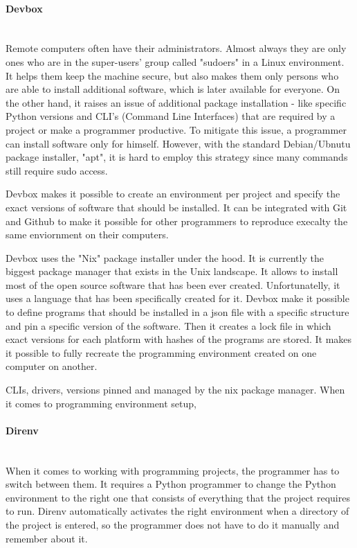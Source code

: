 \paragraph{Devbox}\mbox{}\\
\indent Remote computers often have their administrators. Almost always they are only ones who are in the super-users' group called "sudoers" in a Linux environment. It helps them keep the machine secure, but also makes them only persons who are able to install additional software, which is later available for everyone. On the other hand, it raises an issue of additional package installation - like specific Python versions and CLI's (Command Line Interfaces) that are required by a project or make a programmer productive.  
To mitigate this issue, a programmer can install software only for himself. However, with the standard Debian/Ubnutu package installer, "apt", it is hard to employ this strategy since many commands still require sudo access. 

Devbox makes it possible to create an environment per project and specify the exact versions of software that should be installed. It can be integrated with Git and Github to make it possible for other programmers to reproduce execalty the same enviornment on their computers. 

Devbox uses the "Nix" package installer under the hood. It is currently the biggest package manager that exists in the Unix landscape. It allows to install most of the open source software that has been ever created. Unfortunatelly, it uses a language that has been specifically created for it. Devbox make it possible to define programs that should be installed in a json file with a specific structure and pin a specific version of the software. Then it creates a lock file in which exact versions for each platform with hashes of the programs are stored. It makes it possible to fully recreate the programming environment created on one computer on another.

CLIs, drivers, versions pinned and managed by the nix package manager.
When it comes to programming environment setup, 

\paragraph{Direnv}\mbox{}\\
\indent When it comes to working with programming projects, the programmer has to switch between them. It requires a Python programmer to change the Python environment to the right one that consists of everything that the project requires to run. Direnv automatically activates the right environment when a directory of the project is entered, so the programmer does not have to do it manually and remember about it.

